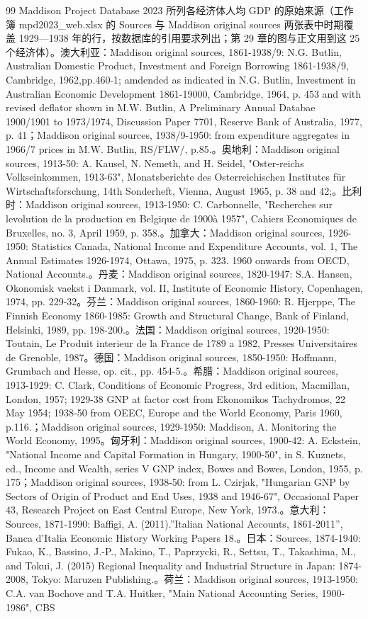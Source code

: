 \begin{thebibliography}{99}
 Maddison Project Database 2023 所列各经济体人均 GDP 的原始来源（工作簿 mpd2023\_web.xlsx 的 Sources 与 Maddison original sources 两张表中时期覆盖 1929—1938 年的行，按数据库的引用要求列出；第 29 章的图与正文用到这 25 个经济体）。澳大利亚：Maddison original sources, 1861-1938/9: N.G. Butlin, Australian Domestic Product, Investment and Foreign Borrowing 1861-1938/9, Cambridge, 1962,pp.460-1; amdended as indicated in N.G. Butlin, Investment in Australian Economic Development 1861-19000, Cambridge, 1964, p. 453 and with revised deflator shown in M.W. Butlin, A Preliminary Annual Databae 1900/1901 to 1973/1974, Discussion Paper 7701, Reserve Bank of Australia, 1977, p. 41；Maddison original sources, 1938/9-1950: from expenditure aggregates in 1966/7 prices in M.W. Butlin, RS/FLW/, p.85.。奥地利：Maddison original sources, 1913-50: A. Kausel, N. Nemeth, and H. Seidel, "Oster-reichs Volkseinkommen, 1913-63", Monatsberichte des Osterreichischen Institutes für Wirtschaftsforschung, 14th Sonderheft, Vienna, August 1965, p. 38 and 42;。比利时：Maddison original sources, 1913-1950: C. Carbonnelle, "Recherches sur levolution de la production en Belgique de 1900à 1957", Cahiers Economiques de Bruxelles, no. 3, April 1959, p. 358.。加拿大：Maddison original sources, 1926-1950: Statistics Canada, National Income and Expenditure Accounts, vol. 1, The Annual Estimates 1926-1974, Ottawa, 1975, p. 323. 1960 onwards from OECD, National Accounts.。丹麦：Maddison original sources, 1820-1947: S.A. Hansen, Okonomisk vaekst i Danmark, vol. II, Institute of Economic History, Copenhagen, 1974, pp. 229-32。芬兰：Maddison original sources, 1860-1960: R. Hjerppe, The Finnish Economy 1860-1985: Growth and Structural Change, Bank of Finland, Helsinki, 1989, pp. 198-200.。法国：Maddison original sources, 1920-1950: Toutain, Le Produit interieur de la France de 1789 a 1982, Presses Universitaires de Grenoble, 1987。德国：Maddison original sources, 1850-1950: Hoffmann, Grumbach and Hesse, op. cit., pp. 454-5.。希腊：Maddison original sources, 1913-1929: C. Clark, Conditions of Economic Progress, 3rd edition, Macmillan, London, 1957; 1929-38 GNP at factor cost from Ekonomikos Tachydromos, 22 May 1954; 1938-50 from OEEC, Europe and the World Economy, Paris 1960, p.116.；Maddison original sources, 1929-1950: Maddison, A. Monitoring the World Economy, 1995。匈牙利：Maddison original sources, 1900-42: A. Eckstein, "National Income and Capital Formation in Hungary, 1900-50", in S. Kuznets, ed., Income and Wealth, series V GNP index, Bowes and Bowes, London, 1955, p. 175；Maddison original sources, 1938-50: from L. Czirjak, "Hungarian GNP by Sectors of Origin of Product and End Uses, 1938 and 1946-67", Occasional Paper 43, Research Project on East Central Europe, New York, 1973.。意大利：Sources, 1871-1990: Baffigi, A. (2011).”Italian National Accounts, 1861-2011”, Banca d’Italia Economic History Working Papers 18.。日本：Sources, 1874-1940: Fukao, K., Bassino, J.-P., Makino, T., Paprzycki, R., Settsu, T., Takashima, M., and Tokui, J. (2015) Regional Inequality and Industrial Structure in Japan: 1874-2008, Tokyo: Maruzen Publishing.。荷兰：Maddison original sources, 1913-1950: C.A. van Bochove and T.A. Huitker, "Main National Accounting Series, 1900-1986", CBS 
\end{thebibliography}
